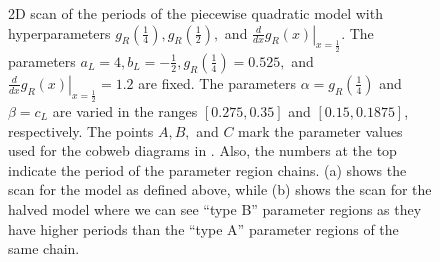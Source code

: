 \begin{figure}
	\centering
	\caption[2D scan of the periods of the quadratic model with hyperparameters for different values of the fixed parameters]{
	2D scan of the periods of the piecewise quadratic model with hyperparameters $g_R\left(\frac{1}{4}\right), g_R\left(\frac{1}{2}\right),$ and $\left. \frac{d}{dx} g_R\left(x\right) \right|_{x = \frac{1}{2}}$.
	The parameters $a_L = 4, b_L = -\frac{1}{2}, g_R\left(\frac{1}{4}\right) = 0.525,$ and $\left. \frac{d}{dx} g_R\left(x\right) \right|_{x = \frac{1}{2}} = 1.2$ are fixed.
	The parameters $\alpha = g_R\left(\frac{1}{4}\right)$ and $\beta = c_L$ are varied in the ranges $[0.275, 0.35]$ and $[0.15, 0.1875]$, respectively.
	The points $A, B,$ and $C$ mark the parameter values used for the cobweb diagrams in .
	Also, the numbers at the top indicate the period of the parameter region chains.
	(a) shows the scan for the model as defined above, while (b) shows the scan for the halved model where we can see ``type B'' parameter regions as they have higher periods than the ``type A'' parameter regions of the same chain.
	}
	\label{fig:setup.quad.hyper.2.period}
\end{figure}


